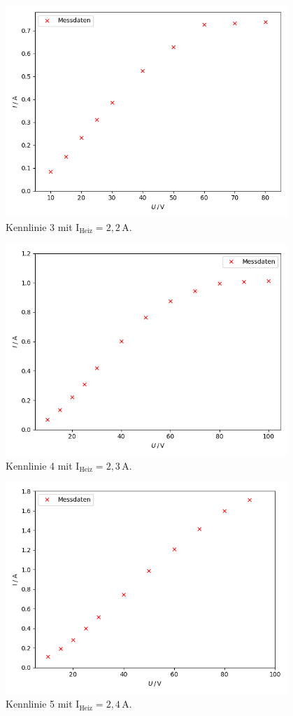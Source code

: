 \begin{figure}[H]
    \centering
    \includegraphics[height=80mm]{bilder/K3.png}
    \caption{Kennlinie 3 mit $\text{I}_{\text{Heiz}} = 2,2\,\unit{\ampere} $.\label{Abbildung8} }
\end{figure}

\begin{figure}[H]
    \centering
    \includegraphics[height=80mm]{bilder/K4.png}
    \caption{Kennlinie 4 mit $\text{I}_{\text{Heiz}} = 2,3\,\unit{\ampere} $.\label{Abbildung9} }
\end{figure}

\begin{figure}[H]
    \centering
    \includegraphics[height=80mm]{bilder/K5.png}
    \caption{Kennlinie 5 mit $\text{I}_{\text{Heiz}} = 2,4\,\unit{\ampere} $.\label{Abbildung10} }
\end{figure}

